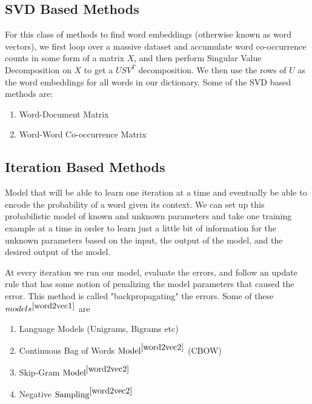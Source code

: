 \documentclass[12pt]{report}
\begin{document}
\subsection{SVD Based Methods}
For this class of methods to find word embeddings (otherwise known
as word vectors), we first loop over a massive dataset and accumulate
word co-occurrence counts in some form of a matrix $X$, and then
perform Singular Value Decomposition on $X$ to get a $USV^{T}$ decomposition.
We then use the rows of $U$ as the word embeddings for all words in our dictionary. Some of the SVD based methods are:

\begin{enumerate}
\item Word-Document Matrix
\item Word-Word Co-occurrence Matrix
\end{enumerate}

\subsection{Iteration Based Methods}
Model that will be able
to learn one iteration at a time and eventually be able to encode the
probability of a word given its context. We can set up this probabilistic model of known and unknown
parameters and take one training example at a time in order to learn
just a little bit of information for the unknown parameters based on
the input, the output of the model, and the desired output of the
model.

At every iteration we run our model, evaluate the errors, and
follow an update rule that has some notion of penalizing the model
parameters that caused the error. This method is called "backpropagating" the errors. Some of these  $models^{\cite{word2vec1}}$ are

\begin{enumerate}
\item Language Models (Unigrams, Bigrams etc)
\item Continuous Bag of Words $\text{Model}^{\cite{word2vec2}}$ (CBOW)
\item Skip-Gram $\text{Model}^{\cite{word2vec2}}$
\item Negative $\text{Sampling}^{\cite{word2vec2}}$
\end{enumerate}
\end{document}
